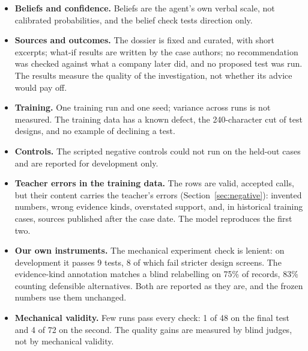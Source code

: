 \begin{itemize}
        system ($-0.67$ and $-0.63$) at lower cost.
  \item \textbf{Beliefs and confidence.} Beliefs are the agent's own verbal scale, not calibrated probabilities, and the
        belief check tests direction only.
  \item \textbf{Sources and outcomes.} The dossier is fixed and curated, with short excerpts; what-if results are
        written by the case authors; no recommendation was checked against what a company later did, and no proposed
        test was run. The results measure the quality of the investigation, not whether its advice would pay off.
  \item \textbf{Training.} One training run and one seed; variance across runs is not measured. The training data has a
        known defect, the 240-character cut of test designs, and no example of declining a test.
  \item \textbf{Controls.} The scripted negative controls could not run on the held-out cases and are reported for
        development only.
  \item \textbf{Teacher errors in the training data.} The rows are valid, accepted calls, but their content carries
        the teacher's errors (Section~\ref{sec:negative}): invented numbers, wrong evidence kinds, overstated support,
        and, in historical training cases, sources published after the case date. The model reproduces the first two.
  \item \textbf{Our own instruments.} The mechanical experiment check is lenient: on development it passes 9 tests, 8
        of which fail stricter design screens. The evidence-kind annotation matches a blind relabelling on 75\% of records, 83\% counting defensible
        alternatives. Both are reported
        as they are, and the frozen numbers use them unchanged.
  \item \textbf{Mechanical validity.} Few runs pass every check: 1 of 48 on the final test and 4 of 72 on the second.
        The quality gains are measured by blind judges, not by mechanical validity.
\end{itemize}

